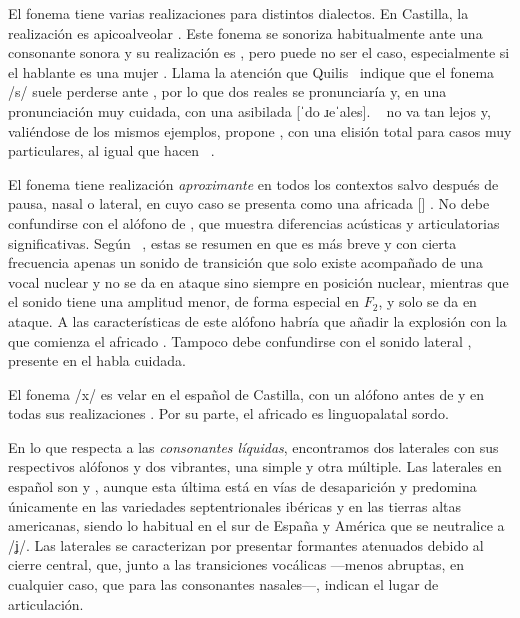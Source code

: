 El fonema  tiene varias realizaciones para distintos dialectos. En Castilla, la realización es apicoalveolar \parencite[248]{quilis2019}. Este fonema se sonoriza habitualmente ante una consonante sonora y su realización es \ipa{[s̬]} \parencites{torreblanca1978}[251]{quilis2019}, pero puede no ser el caso, especialmente si el hablante  es una mujer \parencite{muniz2012}. Llama la atención que Quilis~\parencite*[251]{quilis2019} indique que el fonema /s/ suele perderse ante , por lo que \textlangle{}dos reales\textrangle{} se pronunciaría  y, en una pronunciación muy cuidada, con una  asibilada [ˈdo ɹeˈales]. \citeauthor{navarrotomas2004}~\parencite*[107]{navarrotomas2004} no va tan lejos y, valiéndose de los mismos ejemplos, propone , con una elisión total para casos muy particulares, al igual que hacen \citeauthor{canellada1987}~\parencite*[23]{canellada1987}.

El fonema  tiene realización \textit{aproximante} en todos los contextos salvo después de pausa, nasal o lateral, en cuyo caso se presenta como una africada [] \parencite{martinez2003}. No debe confundirse con el alófono \ipa{[j]} de , que muestra diferencias acústicas y articulatorias significativas. Según \citeauthor{martinezceldran2004}~\parencite*[205-208]{martinezceldran2004}, estas se resumen en que \ipa{[j]} es más breve y con cierta frecuencia apenas un sonido de transición que solo existe acompañado de una vocal nuclear y no se da en ataque sino siempre en posición nuclear, mientras que el sonido \ipa{[\textlowering{ʝ}]} tiene una amplitud menor, de forma especial en $F_{2}$, y solo se da en ataque. A las características de este alófono habría que añadir la explosión con la que comienza el africado . Tampoco debe confundirse con el sonido lateral  \parencite[287]{clegg2018}, presente en el habla cuidada.

El fonema /x/ es velar en el español de Castilla, con un alófono \ipa{[χ]} antes de  y  en todas sus realizaciones \parencite{martinez2003}. Por su parte, el africado  es linguopalatal sordo.

En lo que respecta a las \textit{consonantes líquidas}, encontramos dos laterales con sus respectivos alófonos y dos vibrantes, una simple y otra múltiple. Las laterales en español son  y , aunque esta última está en vías de desaparición y predomina únicamente en las variedades septentrionales ibéricas y en las tierras altas americanas, siendo lo habitual en el sur de España y América que se neutralice a /ʝ/. Las laterales se caracterizan por presentar formantes atenuados debido al cierre central, que, junto a las transiciones vocálicas —menos abruptas, en cualquier caso, que para las consonantes nasales—, indican el lugar de articulación.

